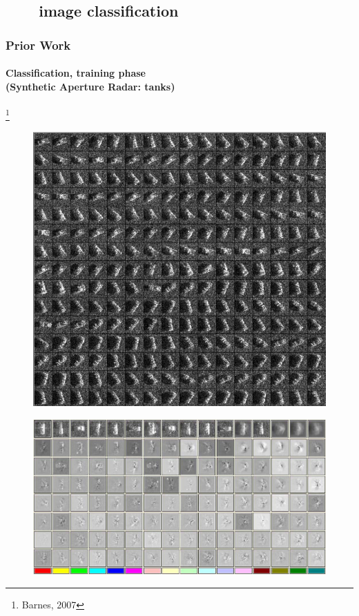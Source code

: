 \subsection{\ \ \ \ image classification}

\begin{frame}
\frametitle{Prior Work}
\framesubtitle{\small Classification, training phase \\(Synthetic Aperture Radar: tanks)}
\logoCSIPCPL\mypagenum\footnote{Barnes, 2007}
	\begin{figure}		
		\includegraphics[height=0.30\textheight]{figs/RVQ_SARtank_1_snippets.png}			
	\end{figure}
	\begin{figure}
		\includegraphics[height=0.30\textheight]{figs/RVQ_SARtank_2_codebooks.png}
	\end{figure}
\end{frame}




